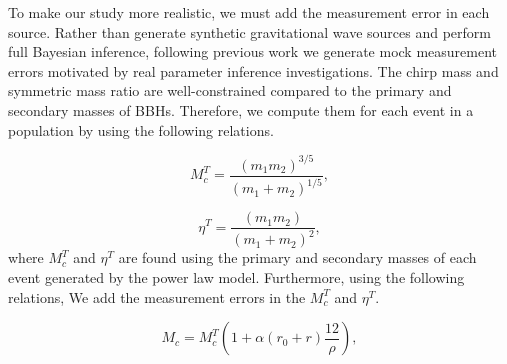\documentclass[twocolumn,prd,nofootinbib]{revtex4}
\begin{document}

To make our study more realistic, we must add the measurement error in each source.  Rather than generate synthetic gravitational wave sources and perform full Bayesian inference, following previous work \cite{Mandel_2017_Errors} we generate mock measurement errors motivated by real parameter inference investigations. The chirp mass and symmetric mass ratio are well-constrained compared to the primary and secondary masses of BBHs. Therefore, we compute them for each event in a population by using the following relations.

\begin{equation}
    M_c^T = \frac{(m_1 m_2)^{3/5}}{(m_1+m_2)^{1/5}},
\end{equation}

\begin{equation}
    \eta^T = \frac{(m_1 m_2)}{(m_1+m_2)^2},
\end{equation}
%
where $M_c^T$ and $\eta^T$ are found using the primary and secondary masses of each event generated by the power law model.
Furthermore, using the following relations, We add the measurement errors in the $M_c^T$ and $\eta^T$.

\begin{equation}
    M_c = M_c^T\left( 1+\alpha (r_0+r ) \frac{12}{\rho}\right),
\end{equation}
\end{document}
